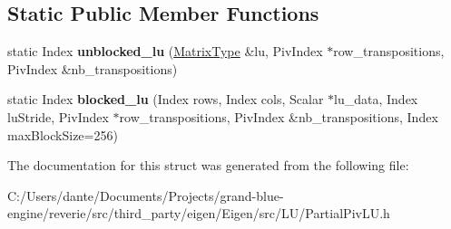 \subsection*{Static Public Member Functions}
\begin{DoxyCompactItemize}
\item 
\mbox{\label{struct_eigen_1_1internal_1_1partial__lu__impl_abbae34180cea8ab2f3cee5def899d9fc}} 
static Index {\bfseries unblocked\+\_\+lu} (\mbox{\hyperlink{class_eigen_1_1_block}{Matrix\+Type}} \&lu, Piv\+Index $\ast$row\+\_\+transpositions, Piv\+Index \&nb\+\_\+transpositions)
\item 
\mbox{\label{struct_eigen_1_1internal_1_1partial__lu__impl_ab66f4cb2c3942d9c5a09aa4a26a15349}} 
static Index {\bfseries blocked\+\_\+lu} (Index rows, Index cols, Scalar $\ast$lu\+\_\+data, Index lu\+Stride, Piv\+Index $\ast$row\+\_\+transpositions, Piv\+Index \&nb\+\_\+transpositions, Index max\+Block\+Size=256)
\end{DoxyCompactItemize}


The documentation for this struct was generated from the following file\+:\begin{DoxyCompactItemize}
\item 
C\+:/\+Users/dante/\+Documents/\+Projects/grand-\/blue-\/engine/reverie/src/third\+\_\+party/eigen/\+Eigen/src/\+L\+U/Partial\+Piv\+L\+U.\+h\end{DoxyCompactItemize}
